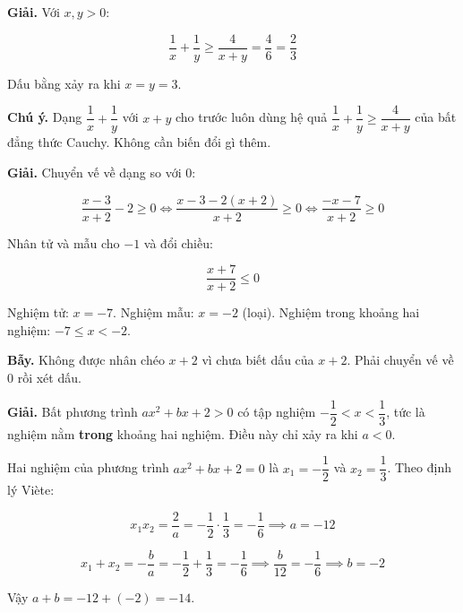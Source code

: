 \documentclass[11pt, a4paper]{article}
\begin{document}
\begin{dapan}[19 — Đáp án C]
\textbf{Giải.} Với $x, y > 0$:

$$\frac{1}{x} + \frac{1}{y} \ge \frac{4}{x+y} = \frac{4}{6} = \frac{2}{3}$$

Dấu bằng xảy ra khi $x = y = 3$.

\textbf{Chú ý.} Dạng $\dfrac{1}{x} + \dfrac{1}{y}$ với $x + y$ cho trước luôn dùng hệ quả $\dfrac{1}{x} + \dfrac{1}{y} \ge \dfrac{4}{x+y}$ của bất đẳng thức Cauchy. Không cần biến đổi gì thêm.
\end{dapan}

\begin{dapan}[20 — Đáp án C]
\textbf{Giải.} Chuyển vế về dạng so với $0$:

$$\frac{x-3}{x+2} - 2 \ge 0 \iff \frac{x-3-2(x+2)}{x+2} \ge 0 \iff \frac{-x-7}{x+2} \ge 0$$

Nhân tử và mẫu cho $-1$ và đổi chiều:

$$\frac{x+7}{x+2} \le 0$$

Nghiệm tử: $x = -7$. Nghiệm mẫu: $x = -2$ (loại). Nghiệm trong khoảng hai nghiệm: $-7 \le x < -2$.

\textbf{Bẫy.} Không được nhân chéo $x+2$ vì chưa biết dấu của $x+2$. Phải chuyển vế về $0$ rồi xét dấu.
\end{dapan}

\begin{dapan}[21 — Đáp án A]
\textbf{Giải.} Bất phương trình $ax^2 + bx + 2 > 0$ có tập nghiệm $-\dfrac{1}{2} < x < \dfrac{1}{3}$, tức là nghiệm nằm \textbf{trong} khoảng hai nghiệm. Điều này chỉ xảy ra khi $a < 0$.

Hai nghiệm của phương trình $ax^2 + bx + 2 = 0$ là $x_1 = -\dfrac{1}{2}$ và $x_2 = \dfrac{1}{3}$. Theo định lý Viète:

$$x_1 x_2 = \frac{2}{a} = -\frac{1}{2} \cdot \frac{1}{3} = -\frac{1}{6} \implies a = -12$$

$$x_1 + x_2 = -\frac{b}{a} = -\frac{1}{2} + \frac{1}{3} = -\frac{1}{6} \implies \frac{b}{12} = -\frac{1}{6} \implies b = -2$$

Vậy $a + b = -12 + (-2) = -14$.
\end{dapan}
\end{document}
